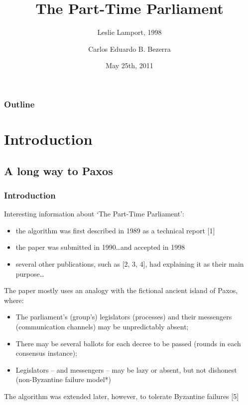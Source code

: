\documentclass[10 pt]{beamer}
\title[{\makebox[.45\paperwidth]{The Part-Time Parliament\hfill\insertframenumber/\inserttotalframenumber}}]{The Part-Time Parliament}
\subtitle{Leslie Lamport, 1998}
\author{Carlos Eduardo B. Bezerra}
\institute[Universities of]
{
Faculty of Informatics\\
Universittà della Svizzera italiana
}
\date{May 25th, 2011}
\begin{document}
\begin{frame}
  \titlepage
\end{frame}



\begin{frame}
  \frametitle{Outline}
  \tableofcontents
\end{frame}



\section{Introduction}

\subsection{A long way to Paxos}

\begin{frame}
  \frametitle{Introduction}

  Interesting information about `The Part-Time Parliament':
  
  \begin{itemize}
    \item the algorithm was first described in 1989 as a technical report [1]
    \item the paper was submitted in 1990\ldots and accepted in 1998%
    \item several other publications, such as [2, 3, 4], had explaining it as their main purpose\ldots
  \end{itemize}

\end{frame}



\begin{frame}

  The paper mostly uses an analogy with the fictional ancient island of Paxos, where:
  \begin{itemize}
    \item The parliament's (group's) legislators (processes) and their messengers (communication channels) may be unpredictably absent;
    \item There may be several ballots for each decree to be passed (rounds in each consensus instance);
    \item Legislators -- and messengers -- may be lazy or absent, but not dishonest (non-Byzantine failure model*)
  \end{itemize}
  \vspace{6 mm}
  {\small * The algorithm was extended later, however, to tolerate Byzantine failures [5]}
\end{frame}
\end{document}
